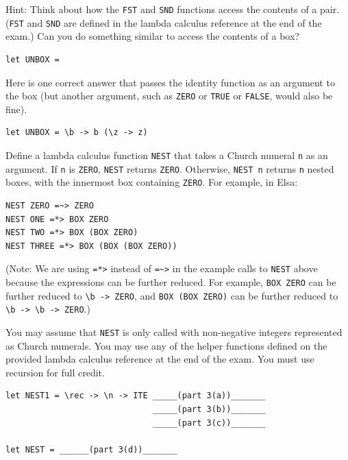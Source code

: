 \documentclass[addpoints]{exam}
\begin{document}
\begin{questions}
Hint: Think about how the \verb|FST| and \verb|SND| functions access the contents of a pair.  (\verb|FST| and \verb|SND| are defined in the lambda calculus reference at the end of the exam.)  Can you do something similar to access the contents of a box?

\begin{verbatim}
let UNBOX = 
\end{verbatim}
\begin{solutionorbox}[1.5in]
Here is one correct answer that passes the identity function as an argument to the box (but another argument, such as \texttt{ZERO} or \texttt{TRUE} or \texttt{FALSE}, would also be fine).
\begin{verbatim}
let UNBOX = \b -> b (\z -> z)
\end{verbatim}
\end{solutionorbox}

\newpage

\question Define a lambda calculus function \texttt{NEST} that takes a Church numeral \texttt{n} as an argument.  If \texttt{n} is \texttt{ZERO}, \texttt{NEST} returns \texttt{ZERO}.  Otherwise, \texttt{NEST n} returns \texttt{n} nested boxes, with the innermost box containing \texttt{ZERO}. For example, in Elsa:

\begin{verbatim}
NEST ZERO =~> ZERO
NEST ONE =*> BOX ZERO
NEST TWO =*> BOX (BOX ZERO)
NEST THREE =*> BOX (BOX (BOX ZERO))
\end{verbatim}

(Note: We are using \texttt{=*>} instead of \verb|=~>| in the example calls to \texttt{NEST} above because the expressions can be further reduced.  For example, \texttt{BOX ZERO} can be further reduced to \verb|\b -> ZERO|, and \texttt{BOX (BOX ZERO)} can be further reduced to \verb|\b -> \b -> ZERO|.)

You may assume that \texttt{NEST} is only called with non-negative integers represented as Church numerals.  You may use any of the helper functions defined on the provided lambda calculus reference at the end of the exam. You must use recursion for full credit.

\begin{verbatim}
let NEST1 = \rec -> \n -> ITE _____(part 3(a))_______
                              _____(part 3(b))_______
                              _____(part 3(c))_______
                      
let NEST = ______(part 3(d))_______
\end{verbatim}


\end{questions}
\end{document}
